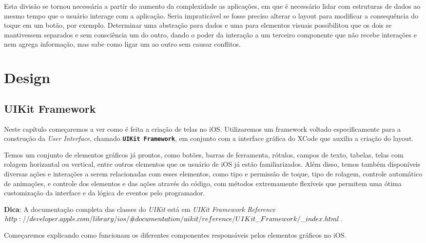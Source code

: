 \documentclass[a4paper,12pt,brazil,doubleside]{book}
\begin{document}
\begin{singlespace}
Esta divisão se tornou necessária a partir do aumento da complexidade as aplicações, em que é necessário lidar com estruturas de dados ao mesmo tempo que o usuário interage com a aplicação. Seria impraticável se fosse preciso alterar o layout para modificar a consequência do toque em um botão, por exemplo. Determinar uma abstração para dados e uma para elementos visuais possibilitou que os dois se mantivessem separados e sem consciência um do outro, dando o poder da interação a um terceiro componente que não recebe interações e nem agrega informação, mas sabe como ligar um ao outro sem causar conflitos.

\chapter{Design}

\section{UIKit Framework}


Neste capítulo começaremos a ver como é feita a criação de telas no iOS. Utilizaremos um framework voltado especificamente para a construção da \emph{User Interface}, chamado \texttt{\textbf{UIKit Framework}}, em conjunto com a interface gráfica do XCode que auxilia a criação do layout.

Temos um conjunto de elementos gráficos já prontos, como botões, barras de ferramenta, rótulos, campos de texto, tabelas, telas com rolagem horizantal ou vertical, entre outros elementos que os usuário de iOS já estão familiarizados. Além disso, temos também disponíveis diversas ações e interações a serem relacionadas com esses elementos, como tipo e permissão de toque, tipo de rolagem, controle automático de animações, e controle dos elementos e das ações através do código, com métodos extremamente flexíveis que permitem uma ótima customização da interface e da lógica de eventos pelo programador.

\begin{framed}

\textbf{Dica}:  A documentação completa das classes do \textit{UIKit} está em 
\textit{ UIKit Framework Reference\\ \(http://developer.apple.com/library/ios/\#documentation/uikit/reference/\\UIKit\_Framework/\_index.html\)}.
\end{framed}


Começaremos explicando como funcionam os diferentes componentes responsáveis pelos elementos gráficos no iOS.


\end{singlespace}
\end{document}
